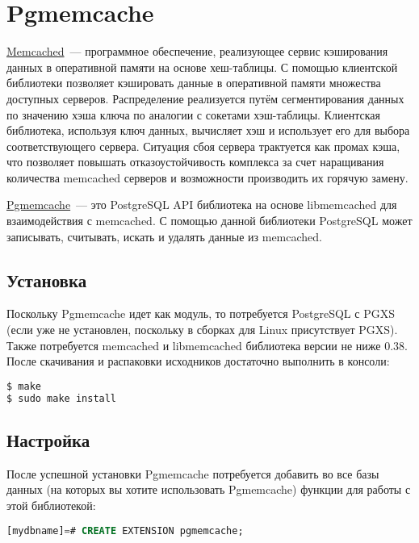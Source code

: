 \section{Pgmemcache}
\label{sec:pgmemcache}

\href{http://memcached.org/}{Memcached}~--- программное обеспечение, реализующее сервис кэширования данных в оперативной памяти на основе хеш-таблицы. С помощью клиентской библиотеки позволяет кэшировать данные в оперативной памяти множества доступных серверов. Распределение реализуется путём сегментирования данных по значению хэша ключа по аналогии с сокетами хэш-таблицы. Клиентская библиотека, используя ключ данных, вычисляет хэш и использует его для выбора соответствующего сервера. Ситуация сбоя сервера трактуется как промах кэша, что позволяет повышать отказоустойчивость комплекса за счет наращивания количества memcached серверов и возможности производить их горячую замену.

\href{http://pgfoundry.org/projects/pgmemcache/}{Pgmemcache}~--- это PostgreSQL API библиотека на основе libmemcached для взаимодействия с memcached. С помощью данной библиотеки PostgreSQL может записывать, считывать, искать и удалять данные из memcached.


\subsection{Установка}

Поскольку Pgmemcache идет как модуль, то потребуется PostgreSQL с PGXS (если уже не установлен, поскольку в сборках для Linux присутствует PGXS). Также потребуется memcached и libmemcached библиотека версии не ниже 0.38. После скачивания и распаковки исходников достаточно выполнить в консоли:

\begin{lstlisting}[language=Bash,label=lst:pgcache1,caption=Установка из исходников]
$ make
$ sudo make install
\end{lstlisting}


\subsection{Настройка}

После успешной установки Pgmemcache потребуется добавить во все базы данных (на которых вы хотите использовать Pgmemcache) функции для работы с этой библиотекой:

\begin{lstlisting}[language=SQL,label=lst:pgcache5,caption=Настройка]
% psql [mydbname] [pguser]
[mydbname]=# CREATE EXTENSION pgmemcache;
\end{lstlisting}

